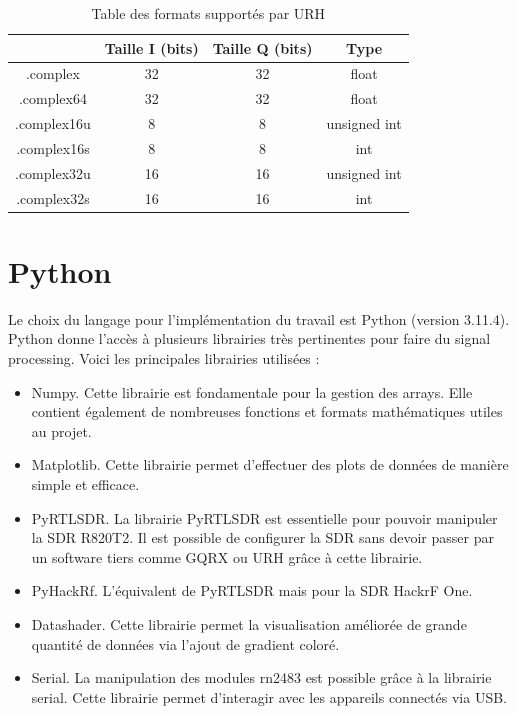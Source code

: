 \begin{table}[h]
\centering
\begin{tabular}{|c|c|c|c|}
\hline
\multicolumn{1}{|c|}{} & \multicolumn{1}{c|}{Taille I (bits)} &\multicolumn{1}{c|}{Taille Q (bits)} & \multicolumn{1}{c|}{Type}\\
\hline
.complex & 32 & 32 & float \\
\hline
.complex64 & 32 & 32 & float\\
\hline
.complex16u & 8 & 8 & unsigned int\\
\hline
.complex16s &  8 & 8 & int\\
\hline
.complex32u & 16 & 16 & unsigned int \\
\hline
.complex32s & 16 & 16 & int  \\
\hline
\end{tabular}
\caption{Table des formats supportés par URH}
\label{format}
\end{table}



\section{Python}

Le choix du langage pour l'implémentation du travail est Python (version 3.11.4). Python donne l'accès à plusieurs librairies très pertinentes pour faire du signal processing. Voici les principales librairies utilisées :

\vspace{0.1cm}

\begin{itemize}
\item Numpy. Cette librairie est fondamentale pour la gestion des arrays. Elle contient également de nombreuses fonctions et formats mathématiques utiles au projet.
\item Matplotlib. Cette librairie permet d'effectuer des plots de données de manière simple et efficace.
\item PyRTLSDR. La librairie PyRTLSDR est essentielle pour pouvoir manipuler la \ac{SDR} R820T2. Il est possible de configurer la SDR sans devoir passer par un software tiers comme GQRX ou \ac{URH} grâce à cette librairie.
\item PyHackRf. L'équivalent de PyRTLSDR mais pour la SDR HackrF One.
\item Datashader. Cette librairie permet la visualisation améliorée de grande quantité de données via l'ajout de gradient coloré.
\item Serial. La manipulation des modules rn2483 est possible grâce à la librairie serial. Cette librairie permet d'interagir avec les appareils connectés via USB.
\end{itemize}

